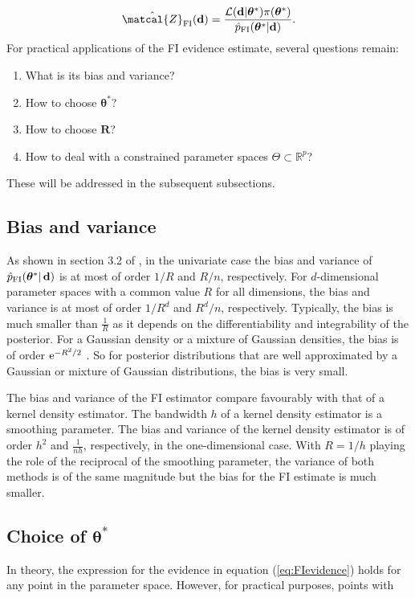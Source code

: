 \documentclass[%
 reprint,
 amsmath,amssymb,
 aps,
]{revtex4-2}
\def\R{\mathbb{R}}
\def\btheta{\boldsymbol{\theta}}
\def\btheta{\boldsymbol{\theta}}
\def\Rbold{\mathbf{R}}
\renewcommand{\d}{{\bf d}}
\newcommand{\btheta}{\mbox{\boldmath $\theta$}}
\newcommand{\e}{{\rm e}}
\begin{document}
\begin{equation}\label{eq:FIevidence}
 \hat{\matcal{Z}}_\text{FI}(\d) = \frac{\mathcal{L}(\d|\btheta^*) 
 \pi(\btheta^*)}{\hat{p}_\text{FI}(\btheta^*|\d)}.
 \end{equation}
For practical applications of the FI evidence estimate, several questions remain:
\begin{enumerate}
     \item What is its bias and variance? 
    \item How to choose $\btheta^*$?
    \item How to choose $\Rbold$?
    \item How to deal with a constrained parameter spaces $\Theta \subset \R^p$?
\end{enumerate}
These will be addressed in the subsequent subsections.


\subsection{\label{subsec:FI bias and variance} Bias and variance}
%
As shown in section 3.2 of \cite{rotiroti2022computing}, in the univariate case the bias and variance of $\hat{p}_\text{FI}(\btheta^*|\,\d)$ is at most of order $1/R$ and  $R/n$, respectively. For $d$-dimensional parameter spaces with a common value $R$ for all dimensions, the bias and variance is at most of order $1/R^d$ and  $R^d/n$, respectively. Typically, the bias is much smaller than $\frac{1}{R}$ as it depends on the differentiability and integrability of the posterior. For a Gaussian density or a mixture of Gaussian densities, the bias is of order $\e^{-R^2/2}$ \cite{rotiroti2022computing}. So for posterior distributions that are well approximated by a Gaussian or mixture of Gaussian distributions, the bias is very small.

The bias and variance of the FI estimator compare favourably with that of a kernel density estimator. The bandwidth $h$ of a kernel density estimator is a smoothing parameter. The bias and variance of the kernel density estimator is of order $h^2$ and $\frac{1}{nh}$, respectively, in the one-dimensional case.  With $R=1/h$ playing the role of the reciprocal of the smoothing parameter, the variance of both methods is of the same magnitude but the bias for the FI estimate is much smaller. 

\subsection{\label{subsec:thetastar} Choice of $\btheta^*$}
In theory, the expression for the evidence in equation (\ref{eq:FIevidence}) holds for any point in the parameter space. However, for practical purposes, points with 
\end{document}
